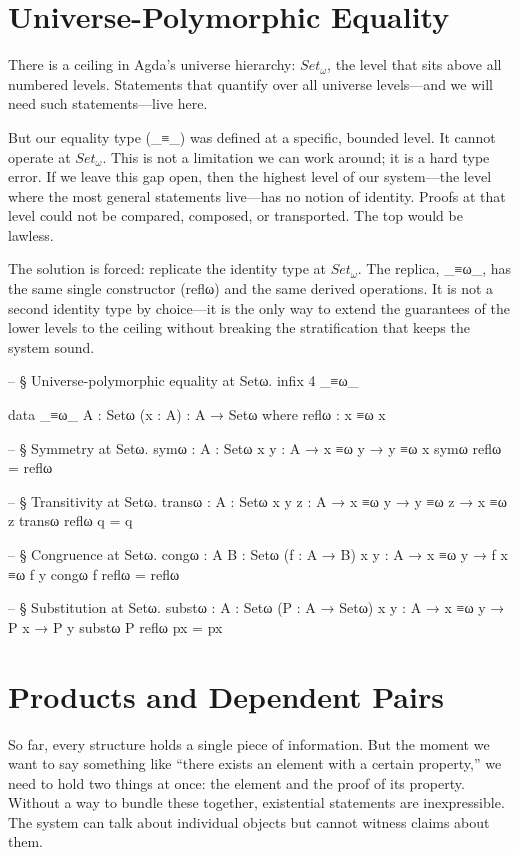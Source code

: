 \documentclass[11pt,a4paper]{book}
\def\texttt#1{#1}%
\begin{document}
\section{Universe-Polymorphic Equality}

There is a ceiling in Agda's universe hierarchy: $\mathit{Set}_\omega$, the level that sits above all numbered levels. Statements that quantify over all universe levels—and we will need such statements—live here.

But our equality type (\texttt{\_≡\_}) was defined at a specific, bounded level. It cannot operate at $\mathit{Set}_\omega$. This is not a limitation we can work around; it is a hard type error. If we leave this gap open, then the highest level of our system—the level where the most general statements live—has no notion of identity. Proofs at that level could not be compared, composed, or transported. The top would be lawless.

The solution is forced: replicate the identity type at $\mathit{Set}_\omega$. The replica, \texttt{\_≡ω\_}, has the same single constructor (\texttt{reflω}) and the same derived operations. It is not a second identity type by choice—it is the only way to extend the guarantees of the lower levels to the ceiling without breaking the stratification that keeps the system sound.

\begin{code}
-- § Universe-polymorphic equality at Setω.
infix 4 _≡ω_

data _≡ω_ {A : Setω} (x : A) : A → Setω where
  reflω : x ≡ω x

-- § Symmetry at Setω.
symω : {A : Setω} {x y : A} → x ≡ω y → y ≡ω x
symω reflω = reflω

-- § Transitivity at Setω.
transω : {A : Setω} {x y z : A} → x ≡ω y → y ≡ω z → x ≡ω z
transω reflω q = q

-- § Congruence at Setω.
congω : {A B : Setω} (f : A → B) {x y : A} → x ≡ω y → f x ≡ω f y
congω f reflω = reflω

-- § Substitution at Setω.
substω : {A : Setω} (P : A → Setω) {x y : A} → x ≡ω y → P x → P y
substω P reflω px = px
\end{code}

\section{Products and Dependent Pairs}

So far, every structure holds a single piece of information. But the moment we want to say something like ``there exists an element with a certain property,'' we need to hold two things at once: the element and the proof of its property. Without a way to bundle these together, existential statements are inexpressible. The system can talk about individual objects but cannot witness claims about them.
\end{document}
